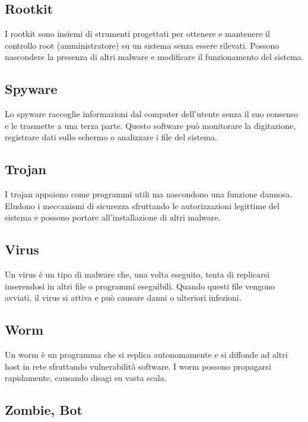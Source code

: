 \subsection{Rootkit}

I rootkit sono insiemi di strumenti progettati per ottenere e mantenere il controllo root (amministratore) su un sistema senza essere rilevati. Possono nascondere la presenza di altri malware e modificare il funzionamento del sistema.

\subsection{Spyware}

Lo spyware raccoglie informazioni dal computer dell'utente senza il suo consenso e le trasmette a una terza parte. Questo software può monitorare la digitazione, registrare dati sullo schermo o analizzare i file del sistema.

\subsection{Trojan}

I trojan appaiono come programmi utili ma nascondono una funzione dannosa. Eludono i meccanismi di sicurezza sfruttando le autorizzazioni legittime del sistema e possono portare all'installazione di altri malware.

\subsection{Virus}

Un virus è un tipo di malware che, una volta eseguito, tenta di replicarsi inserendosi in altri file o programmi eseguibili. Quando questi file vengono avviati, il virus si attiva e può causare danni o ulteriori infezioni.

\subsection{Worm}

Un worm è un programma che si replica autonomamente e si diffonde ad altri host in rete sfruttando vulnerabilità software. I worm possono propagarsi rapidamente, causando disagi su vasta scala.

\subsection{Zombie, Bot}

